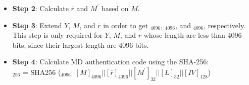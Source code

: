 \documentclass[main\_\_EN.tex]{subfiles}
\begin{document}
\begin{itemize}
    \item {\bfseries Step 2}: Calculate \begin{math}\overline{r}\end{math} and \begin{math}M^{\prime} \end{math} based on \begin{math}M\end{math}.

    \item {\bfseries Step 3}: Extend \begin{math}Y\end{math}, \begin{math}M\end{math}, and \begin{math}\overline{r}\end{math} in order to get \begin{math}[Y]_{4096}\end{math}, \begin{math}[M]_{4096}\end{math}, and \begin{math}[\overline{r}]_{4096}\end{math}, respectively. This step is only required for \begin{math}Y\end{math}, \begin{math}M\end{math}, and \begin{math}\overline{r}\end{math} whose length are less than 4096 bits, since their largest length are 4096 bits.


    \item {\bfseries Step 4}: Calculate MD authentication code using the SHA-256:\\
                \begin{math}[MD]_{256}\end{math} = SHA256 (\begin{math}
                [Y]_{4096} ||
                [M]_{4096} ||
                [\overline{r}]_{4096} ||
                [M^{\prime}]_{32} ||
                [L]_{32} ||
                [IV]_{128}
            \end{math})


\end{itemize}
\end{document}
